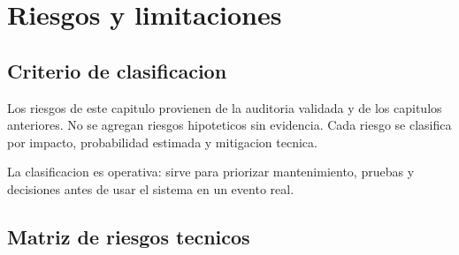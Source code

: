 \chapter{Riesgos y limitaciones}
\label{chap:riesgos-limitaciones}

\section{Criterio de clasificacion}
\label{sec:riesgos-criterio}

Los riesgos de este capitulo provienen de la auditoria validada y de los capitulos anteriores. No se agregan riesgos hipoteticos sin evidencia. Cada riesgo se clasifica por impacto, probabilidad estimada y mitigacion tecnica.

La clasificacion es operativa: sirve para priorizar mantenimiento, pruebas y decisiones antes de usar el sistema en un evento real.

\section{Matriz de riesgos tecnicos}
\label{sec:riesgos-matriz}

